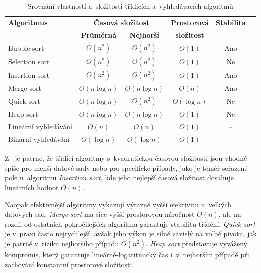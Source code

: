 \begin{table}[ht]
    \centering
    \begin{tabular}{lccccc}
        \toprule
        \textbf{Algoritmus}  & \multicolumn{2}{c}{\textbf{Časová složitost}} & \textbf{Prostorová} & \textbf{Stabilita}       \\
                             & \textbf{Průměrná}                             & \textbf{Nejhorší}   & \textbf{složitost} &     \\
        \midrule
        Bubble sort          & $O(n^2)$                                      & $O(n^2)$            & $O(1)$             & Ano \\
        Selection sort       & $O(n^2)$                                      & $O(n^2)$            & $O(1)$             & Ne  \\
        Insertion sort       & $O(n^2)$                                      & $O(n^2)$            & $O(1)$             & Ano \\
        \midrule
        Merge sort           & $O(n \log n)$                                 & $O(n \log n)$       & $O(n)$             & Ano \\
        Quick sort           & $O(n \log n)$                                 & $O(n^2)$            & $O(\log n)$        & Ne  \\
        Heap sort            & $O(n \log n)$                                 & $O(n \log n)$       & $O(1)$             & Ne  \\
        \midrule
        Lineární vyhledávání & $O(n)$                                        & $O(n)$              & $O(1)$             & --  \\
        Binární vyhledávání  & $O(\log n)$                                   & $O(\log n)$         & $O(1)$             & --  \\
        \bottomrule
    \end{tabular}
    \caption{Srovnání vlastností a~složitosti třídicích a~vyhledávacích algoritmů}
    \label{tab:sorting_comparison}
\end{table}

Z~ je patrné, že třídicí algoritmy s~kvadratickou časovou složitostí jsou vhodné spíše pro menší datové sady nebo pro specifické případy, jako je téměř seřazené pole u~algoritmu \textit{Insertion sort}, kde jeho nejlepší časová složitost dosahuje lineárních hodnot $O(n)$.

Naopak efektivnější algoritmy vykazují výrazně vyšší efektivitu u~velkých datových sad.
\textit{Merge sort} má sice vyšší prostorovou náročnost $O(n)$, ale na rozdíl od ostatních pokročilejších algoritmů garantuje stabilitu třídění.
\textit{Quick sort} je v~praxi často nejrychlejší, avšak jeho výkon je silně závislý na volbě pivotu, jak je patrné v~riziku nejhoršího případu $O(n^2)$.
\textit{Heap sort} představuje vyvážený kompromis, který garantuje lineárně-logaritmický čas i~v~nejhorším případě při zachování konstantní prostorové složitosti.

